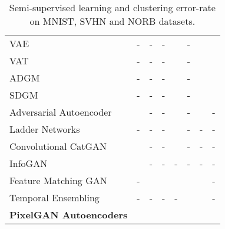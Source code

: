 \documentclass{article}
\begin{document}
\begin{center}
\begin{table}[t]
{\begin{tabular}{l|cccc|cc|c}
VAE~\citep{semi-vae}                            & -                   &-                  & -                 &   & -                               &                &               \\
VAT~\citep{vat}                                 & -                   &-                  & -                 & & -                               &              & \\
ADGM~\citep{adgm}                               & -                   &-                  & -                 &   & -                               &              &               \\
SDGM~\citep{adgm}                               & -                   &-                  & -                 &   & -                               &                &   \\
Adversarial Autoencoder~\citep{aae}             &   &-                  & -                 &   & -                               &                & -                                \\   
Ladder Networks~\citep{ladder}                  & -                   &-                  & -                 &   & -                               & -                                 & -                                \\  
Convolutional CatGAN~\citep{catgan}             & &-                  & -                 &   & -                               & -                                 & -                                \\  
InfoGAN~\citep{infogan}                         & &-                  & -                 & -                   & -                               & -                                 & -                                \\    
Feature Matching GAN~\citep{improved-gan}       & -                   && &   &              &    & -                                \\    
Temporal Ensembling~\citep{temporal-ensembling} & -                   &-                  & -                 & -                   &  &    & -                                \\     
\midrule
\textbf{PixelGAN Autoencoders}                  &   && &   &              &    &    \\
  \bottomrule
\end{tabular}
}
\vspace{.1ex}
\caption{\label{table:semi}Semi-supervised learning and clustering error-rate on MNIST, SVHN and NORB datasets.}
\end{table}
\end{center}
\end{document}
